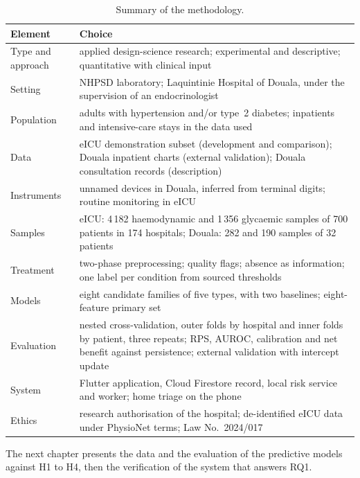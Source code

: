 \begin{table}[htbp]
\centering\footnotesize
\caption{Summary of the methodology.}\label{tab:meth-summary}
\begin{tabularx}{\textwidth}{@{}>{\raggedright\arraybackslash}p{3.0cm} X@{}}
\toprule
\textbf{Element} & \textbf{Choice} \\
\midrule
Type and approach & applied design-science research; experimental and descriptive; quantitative with clinical input \\
Setting & NHPSD laboratory; Laquintinie Hospital of Douala, under the supervision of an endocrinologist \\
Population & adults with hypertension and/or type~2 diabetes; inpatients and intensive-care stays in the data used \\
Data & eICU demonstration subset (development and comparison); Douala inpatient charts (external validation); Douala consultation records (description) \\
Instruments & unnamed devices in Douala, inferred from terminal digits; routine monitoring in eICU \\
Samples & eICU: 4\,182 haemodynamic and 1\,356 glycaemic samples of 700 patients in 174 hospitals; Douala: 282 and 190 samples of 32 patients \\
Treatment & two-phase preprocessing; quality flags; absence as information; one label per condition from sourced thresholds \\
Models & eight candidate families of five types, with two baselines; eight-feature primary set \\
Evaluation & nested cross-validation, outer folds by hospital and inner folds by patient, three repeats; RPS, AUROC, calibration and net benefit against persistence; external validation with intercept update \\
System & Flutter application, Cloud Firestore record, local risk service and worker; home triage on the phone \\
Ethics & research authorisation of the hospital; de-identified eICU data under PhysioNet terms; Law No.~2024/017 \\
\bottomrule
\end{tabularx}
\end{table}

The next chapter presents the data and the evaluation of the predictive models against H1 to H4, then the verification of the system that answers RQ1.
